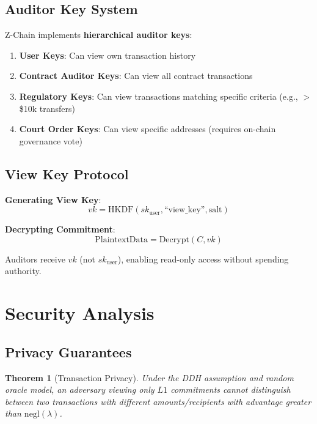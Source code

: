 \documentclass[11pt]{article}
\newtheorem{theorem}{Theorem}
\begin{document}
\subsection{Auditor Key System}

Z-Chain implements \textbf{hierarchical auditor keys}:

\begin{enumerate}
  \item \textbf{User Keys}: Can view own transaction history
  \item \textbf{Contract Auditor Keys}: Can view all contract transactions
  \item \textbf{Regulatory Keys}: Can view transactions matching specific criteria (e.g., $>$ \$10k transfers)
  \item \textbf{Court Order Keys}: Can view specific addresses (requires on-chain governance vote)
\end{enumerate}

\subsection{View Key Protocol}

\textbf{Generating View Key}:
\begin{equation}
vk = \text{HKDF}(sk_{\text{user}}, \text{``view\_key''}, \text{salt})
\end{equation}

\textbf{Decrypting Commitment}:
\begin{equation}
\text{PlaintextData} = \text{Decrypt}(C, vk)
\end{equation}

Auditors receive $vk$ (not $sk_{\text{user}}$), enabling read-only access without spending authority.

\section{Security Analysis}

\subsection{Privacy Guarantees}

\begin{theorem}[Transaction Privacy]
Under the DDH assumption and random oracle model, an adversary viewing only $L1$ commitments cannot distinguish between two transactions with different amounts/recipients with advantage greater than $\text{negl}(\lambda)$.
\end{theorem}
\end{document}
